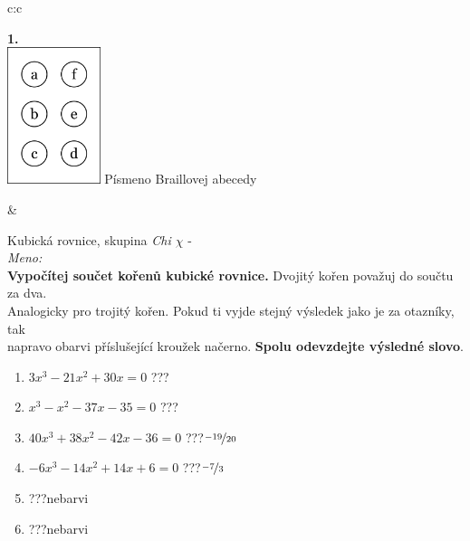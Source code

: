 \documentclass[10pt]{report}
\begin{document}
\begin{tabular}{c:c}
\begin{minipage}[c][99mm][t]{0.49\linewidth}
\begin{center}
\begin{minipage}{0.20\linewidth}
\begin{center}
{\Huge\bfseries 1.} \\[2mm]
\includegraphics[height=40mm]{../images/braille.png}
{\small Písmeno Braillovej abecedy}
\end{center}
\end{minipage}
\end{center}
\end{minipage}
&
\begin{minipage}[c][99mm][t]{0.49\linewidth}
\begin{center}
\vspace{7mm}
{\huge Kubická rovnice, skupina \textit{Chi $\chi$} -}\\[4.5mm]
\textit{Meno:}\phantom{xxxxxxxxxxxxxxxxxxxxxxxxxxxxxxxxxxxxxxxxxxxxxxxxxxxxxxxxxxxxxxxxx}\\[3.5mm]
\textbf{Vypočítej součet kořenů kubické rovnice.} Dvojitý kořen považuj do součtu za dva.\\Analogicky pro trojitý kořen. Pokud ti vyjde stejný výsledek jako je za otazníky, tak\\napravo obarvi příslušející kroužek načerno. \textbf{Spolu odevzdejte výsledné slovo}.\\[3mm]
\begin{minipage}{0.77\linewidth}
\begin{center}
\begin{varwidth}{\textwidth}
\begin{enumerate}
\large
\item $3x^3-21x^2+30x=0$\quad \dotfill\; ???\;\dotfill {}
\item $x^3-x^2-37x-35=0$\quad \dotfill\; ???\;\dotfill {}
\item $40x^3+38x^2-42x-36=0$\quad \dotfill\; ???\;\dotfill \quad $\nicefrac{-19}{20}$
\item $-6x^3-14x^2+14x+6=0$\quad \dotfill\; ???\;\dotfill \quad $\nicefrac{-7}{3}$
\item \quad \dotfill\; ???\;\dotfill \quad nebarvi
\item \quad \dotfill\; ???\;\dotfill \quad nebarvi
\end{enumerate}

\end{varwidth}
\end{center}
\end{minipage}
\end{center}
\end{minipage}
\end{tabular}
\end{document}
